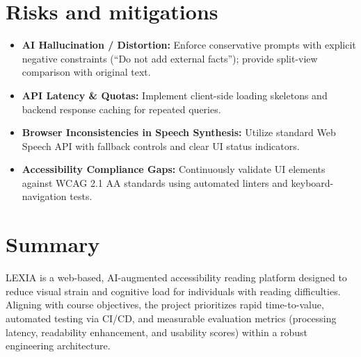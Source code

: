 \documentclass[11pt,a4paper]{article}
\begin{document}
\section{Risks and mitigations}
\begin{itemize}[leftmargin=0.7cm]
    \item \textbf{AI Hallucination / Distortion:} Enforce conservative prompts with explicit negative constraints (``Do not add external facts''); provide split-view comparison with original text.
    \item \textbf{API Latency \& Quotas:} Implement client-side loading skeletons and backend response caching for repeated queries.
    \item \textbf{Browser Inconsistencies in Speech Synthesis:} Utilize standard Web Speech API with fallback controls and clear UI status indicators.
    \item \textbf{Accessibility Compliance Gaps:} Continuously validate UI elements against WCAG 2.1 AA standards using automated linters and keyboard-navigation tests.
\end{itemize}

\section{Summary}
LEXIA is a web-based, AI-augmented accessibility reading platform designed to reduce visual strain and cognitive load for individuals with reading difficulties. Aligning with course objectives, the project prioritizes rapid time-to-value, automated testing via CI/CD, and measurable evaluation metrics (processing latency, readability enhancement, and usability scores) within a robust engineering architecture.
\end{document}

